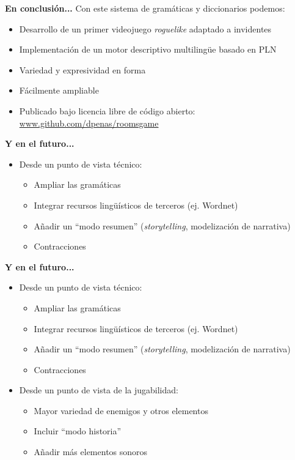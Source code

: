 \begin{tframe}{\textbf{En conclusión...}}
	Con este sistema de gramáticas y diccionarios podemos:
	\begin{itemize}
		\item Desarrollo de un primer videojuego \textit{roguelike} adaptado a invidentes
		\item Implementación de un motor descriptivo multilingüe basado en PLN
		\item Variedad y expresividad en forma
		\item Fácilmente ampliable
		\item<+-| alert@+> Publicado bajo licencia libre de código abierto: \url{www.github.com/dpenas/roomsgame}
	\end{itemize}
\end{tframe}

\begin{tframe}{\textbf{Y en el futuro...}}
	\begin{itemize}
		\item<+-| alert@+> Desde un punto de vista técnico:
			\begin{itemize}
				\item Ampliar las gramáticas
				\item Integrar recursos lingüísticos de terceros (ej. Wordnet)
				\item Añadir un ``modo resumen'' (\textit{storytelling}, modelización de narrativa)
				\item Contracciones
			\end{itemize}
	\end{itemize}
\end{tframe}

\begin{tframe}{\textbf{Y en el futuro...}}
	\begin{itemize}
		\item Desde un punto de vista técnico:
			\begin{itemize}
				\item Ampliar las gramáticas
				\item Integrar recursos lingüísticos de terceros (ej. Wordnet)
				\item Añadir un ``modo resumen'' (\textit{storytelling}, modelización de narrativa)
				\item Contracciones
			\end{itemize}
		\item<+-| alert@+> Desde un punto de vista de la jugabilidad:
			\begin{itemize}
				\item Mayor variedad de enemigos y otros elementos
				\item Incluir ``modo historia''
				\item Añadir más elementos sonoros
			\end{itemize}
	\end{itemize}
\end{tframe}

